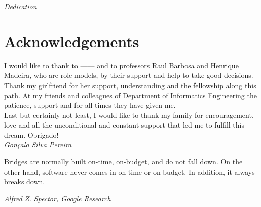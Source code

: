 
\pagestyle{empty}
\begin{center}

\emph{Dedication}

\end{center}

\clearpage
\section*{Acknowledgements}

I would like to thank to ------ and to professors Raul Barbosa and Henrique Madeira, who are role models, by their support and help to take good decisions.\\

Thank my girlfriend for her support, understanding and the fellowship along this path. At my friends and colleagues of Department of Informatics Engineering the patience, support and for all times they have given me. \\

Last but certainly not least, I would like to thank my family for encouragement, love and all the unconditional and constant support that led me to fulfill this dream. Obrigado!\\



\emph{\hfill Gonçalo Silva Pereira}

\clearpage

\vspace*{\fill}
\pagestyle{empty}

\begin{shadequote}
Bridges are normally built on-time, on-budget, and do not
fall down. On the other hand, software never comes in on-time
or on-budget. In addition, it always breaks down.\par\emph{Alfred Z. Spector, Google Research}
\end{shadequote}

